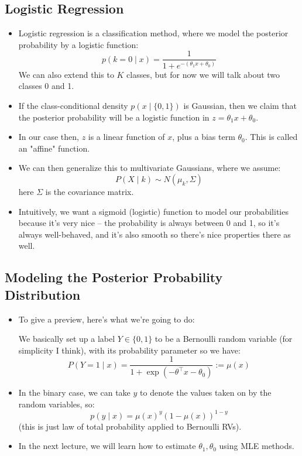 \subsection{Logistic Regression}
\begin{itemize}
	\item Logistic regression is a classification method, where we model the
		posterior probability by a logistic function:
		\[
			p(k = 0 \mid x) = \frac{1}{1 + e^{-(\theta_1 x + \theta_0)}}
		\]
		We can also extend this to \( K \) classes, but for now we will talk about
		two classes 0 and 1.   
	\item If the class-conditional density \( p(x \mid \{0, 1\}) \) is Gaussian, then
		we claim that the posterior probability will be a logistic function 
		in \( z = \theta_1x + \theta_0 \). 


	\item In our case then, \( z \) is a linear function of \( x \), plus a bias term
		\( \theta_0 \). This is called an "affine" function. 
	\item We can then generalize this to multivariate Gaussians, where we assume:
		\[
			P(X \mid k) \sim N(\mu_k, \Sigma)
		\]
		here \( \Sigma \) is the covariance matrix. 

	\item Intuitively, we want a sigmoid (logistic) function to model our
		probabilities because it's very nice -- the probability is always between 0
		and 1, so it's always well-behaved, and it's also smooth so there's nice
		properties there as well. 
\end{itemize}
\subsection{Modeling the Posterior Probability Distribution}
\begin{itemize}
	\item To give a preview, here's what we're going to do:

		We basically set up a label \( Y \in \{0, 1\} \) to be a Bernoulli random
		variable (for simplicity I think), with its probability parameter so we have:
		\[
			P(Y = 1 \mid x) = \frac{1}{1 + \exp(- \theta^{\top} x - \theta_0)} :=
			\mu(x)
		\]
	\item In the binary case, we can take \( y \) to denote the values taken on by
		the random variables, so:
		\[
			p(y \mid x) = \mu(x)^{y} (1 - \mu(x))^{1 - y}
		\]
		(this is just law of total probability applied to Bernoulli RVs). 
	\item In the next lecture, we will learn how to estimate \( \theta_1, \theta_0 \)
		using MLE methods. 
\end{itemize}
